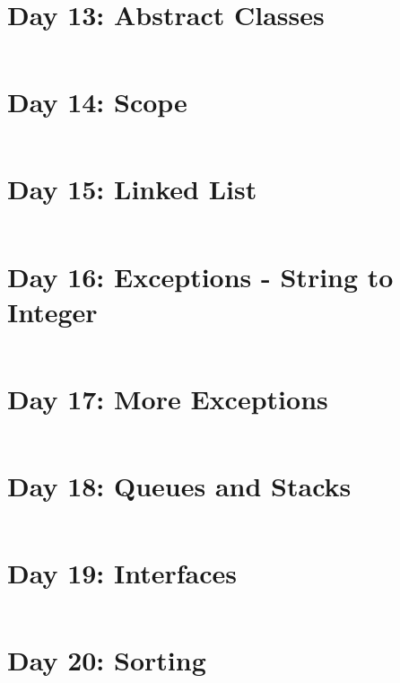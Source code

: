 \documentclass[11pt,a4paper]{article}
\begin{document}
\newpage
\section{Day 13: Abstract Classes}
\begin{lstlisting}
\end{lstlisting}

\newpage
\section{Day 14: Scope}
\begin{lstlisting}
\end{lstlisting}

\newpage
\section{Day 15: Linked List}
\begin{lstlisting}
\end{lstlisting}

\newpage
\section{Day 16: Exceptions - String to Integer}
\begin{lstlisting}
\end{lstlisting}

\newpage
\section{Day 17: More Exceptions}
\begin{lstlisting}
\end{lstlisting}

\newpage
\section{Day 18: Queues and Stacks}
\begin{lstlisting}
\end{lstlisting}

\newpage
\section{Day 19: Interfaces}
\begin{lstlisting}
\end{lstlisting}

\newpage
\section{Day 20: Sorting}
\begin{lstlisting}
\end{lstlisting}
\end{document}
